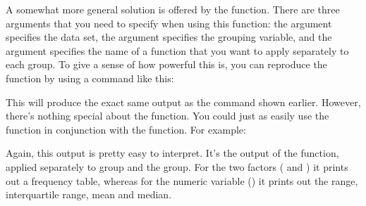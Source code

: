 A somewhat more general solution is offered by the  function. There are three arguments that you need to specify when using this function: the  argument specifies the data set, the  argument specifies the grouping variable, and the  argument specifies the name of a function that you want to apply separately to each group. To give a sense of how powerful this is, you can reproduce the  function by using a command like this:
This will produce the exact same output as the command shown earlier. However, there's nothing special about the  function. You could just as easily use the  function in conjunction with the  function. For example:
Again, this output is pretty easy to interpret. It's the output of the  function, applied separately to  group and the  group. For the two factors ( and ) it prints out a frequency table, whereas for the numeric variable () it prints out the range, interquartile range, mean and median.

